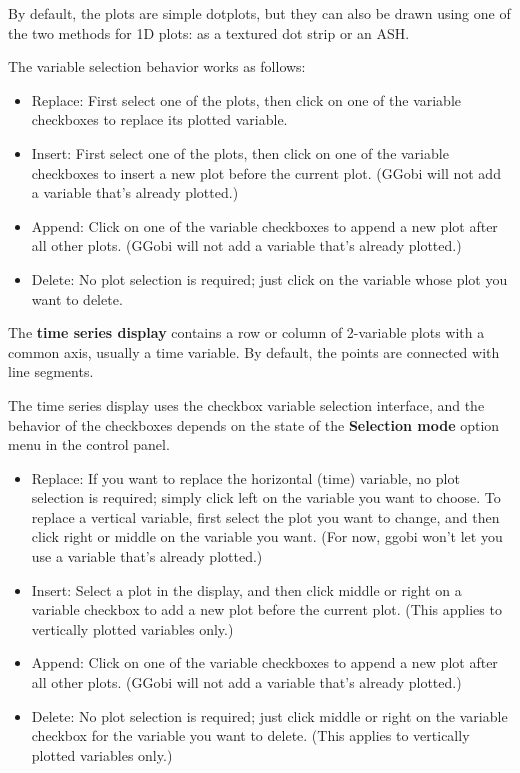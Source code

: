 \documentclass[11pt]{article}
\begin{document}
By default, the plots are simple dotplots, but they can also be drawn
using one of the two methods for 1D plots:  as a textured dot
strip or an ASH.

The variable selection behavior works as follows:

\begin{itemize}
\item Replace:  First select one of the plots, then click on one
  of the variable checkboxes to replace its plotted variable.
\item Insert:  First select one of the plots, then click on
  one of the variable checkboxes to insert a new plot before
  the current plot.  (GGobi will not add a variable that's
  already plotted.)
\item Append:  Click on one of the variable checkboxes to append
  a new plot after all other plots.  (GGobi will not add a variable
  that's already plotted.)
\item Delete:  No plot selection is required; just click on the
  variable whose plot you want to delete.
\end{itemize}

The {\bf time series display} contains a row or column of 2-variable
plots with a common axis, usually a time variable.  By default, the
points are connected with line segments.  

The time series display uses the checkbox variable selection interface,
and the behavior of the checkboxes depends on the state of the
{\bf Selection mode} option menu in the control panel.

\begin{itemize}
\item Replace: If you want to replace the horizontal (time) variable,
  no plot selection is required; simply click left on the variable you
  want to choose.  To replace a vertical variable, first select the
  plot you want to change, and then click right or middle on the
  variable you want.  (For now, ggobi won't let you use a variable
  that's already plotted.)
\item Insert:  Select a plot in the display, and then click
  middle or right on a variable checkbox to add a new plot before
  the current plot.  (This applies to vertically plotted
  variables only.)
\item Append:  Click on one of the variable checkboxes to append
  a new plot after all other plots.  (GGobi will not add a variable
  that's already plotted.)
\item Delete: No plot selection is required; just click middle or
  right on the variable checkbox for the variable you want to
  delete.  (This applies to vertically plotted variables only.)
\end{itemize}
\end{document}
